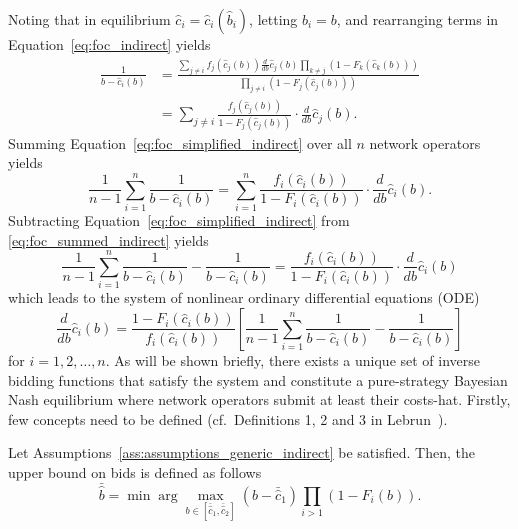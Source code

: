 Noting that in equilibrium $\hat{c}_i = \hat{c}_i(\hat{b}_i)$, letting $\hat{b}_i = b$, and rearranging terms in Equation~\eqref{eq:foc_indirect} yields
\begin{align}
  \label{eq:foc_simplified_indirect}
  \frac{1}{b - \hat{c}_i(b)} 
  &= \frac{\sum_{j\neq i} f_j(\hat{c}_j(b))\frac{d}{db}\hat{c}_j(b)\prod_{k\neq j} \left( 1 - F_k(\hat{c}_k(b)) \right)}{\prod_{j\neq i} \left( 1 - F_j(\hat{c}_j(b)) \right)}\nonumber \\[2ex]
  &= \sum_{j\neq i}\frac{f_j(\hat{c}_j(b))}{1 - F_j(\hat{c}_j(b))}\cdot\frac{d}{db}\hat{c}_j(b).
\end{align}
Summing Equation~\eqref{eq:foc_simplified_indirect} over all $n$ network operators yields
\begin{equation}
  \label{eq:foc_summed_indirect}
  \frac{1}{n-1}\sum_{i=1}^n \frac{1}{b - \hat{c}_i(b)} = \sum_{i=1}^n \frac{f_i(\hat{c}_i(b))}{1 - F_i(\hat{c}_i(b))}\cdot\frac{d}{db}\hat{c}_i(b).
\end{equation}
Subtracting Equation~\eqref{eq:foc_simplified_indirect} from \eqref{eq:foc_summed_indirect} yields 
\begin{equation}
  \frac{1}{n-1}\sum_{i=1}^n \frac{1}{b - \hat{c}_i(b)} - \frac{1}{b - \hat{c}_i(b)} = \frac{f_i(\hat{c}_i(b))}{1 - F_i(\hat{c}_i(b))}\cdot\frac{d}{db}\hat{c}_i(b)
\end{equation}
which leads to the system of nonlinear ordinary differential equations (ODE)
\begin{equation}
  \frac{d}{db}\hat{c}_i(b) = \frac{1 - F_i(\hat{c}_i(b))}{f_i(\hat{c}_i(b))}\left[ \frac{1}{n-1}\sum_{i=1}^n \frac{1}{b-\hat{c}_i(b)} - \frac{1}{b-\hat{c}_i(b)} \right]
\end{equation}
for $i=1,2,\dotsc,n$. As will be shown briefly, there exists a unique set of inverse bidding functions that satisfy the system and constitute a pure-strategy Bayesian Nash equilibrium where network operators submit at least their costs-hat. Firstly, few concepts need to be defined (cf.~Definitions 1, 2 and 3 in Lebrun~\cite{Lebrun2006}).

\begin{define}
\label{def:upper_bound_bids_indirect}
Let Assumptions~\ref{ass:assumptions_generic_indirect} be satisfied. Then, the upper bound on bids is defined as follows
\begin{equation}
  \label{eq:upper_bound_bids_indirect}
  \bar{\hat{b}} = \min\arg\max_{b\in[\bar{\hat{c}}_1, \bar{\hat{c}}_2]}(b - \bar{\hat{c}}_1)\prod_{i>1}\left( 1 - F_i(b) \right).
\end{equation}
\end{define}


